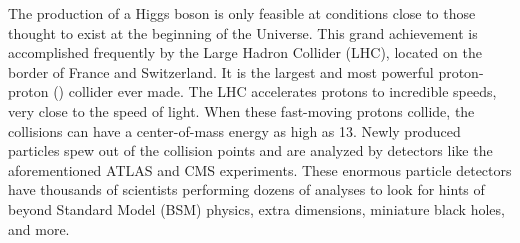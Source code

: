 The production of a Higgs boson is only feasible at conditions close to those thought to exist at the beginning of the Universe.
This grand achievement is accomplished frequently by the Large Hadron Collider (LHC), located on the border of France and Switzerland.
It is the largest and most powerful proton-proton (\pp) collider ever made.
The LHC accelerates protons to incredible speeds, very close to the speed of light.
When these fast-moving protons collide, the \pp collisions can have a center-of-mass energy as high as 13\TeV.
Newly produced particles spew out of the collision points and are analyzed by detectors like the aforementioned ATLAS and CMS experiments.
These enormous particle detectors have thousands of scientists performing dozens of analyses to look for hints of beyond Standard Model (BSM) physics, extra dimensions, miniature black holes, and more.

